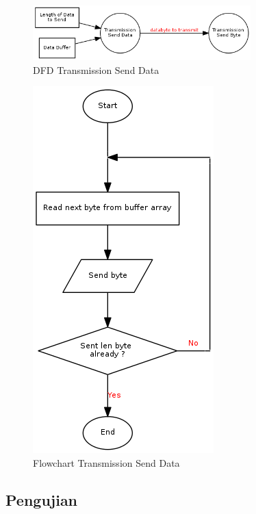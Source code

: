 \begin{figure}[!h]
\centering
\includegraphics[width=0.75\textwidth]{image/transmission/dfd_senddata.png}
\caption{DFD Transmission Send Data}
\label{fig-dfd-senddata}
\end{figure}

\begin{figure}[!h]
\centering
\includegraphics[height=0.5\textheight]{image/transmission/flow_senddata.png}
\caption{Flowchart Transmission Send Data}
\label{fig-flow-senddata}
\end{figure}

\subsection {Pengujian}

